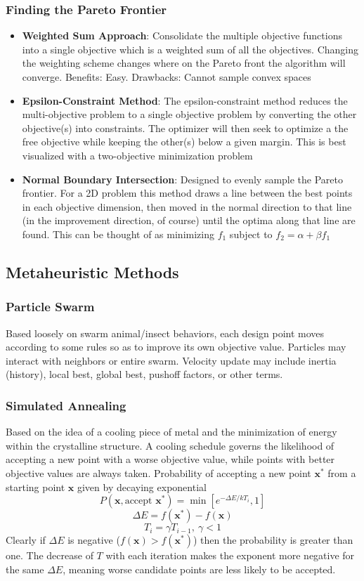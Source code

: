 \documentclass[12pt]{article}
\newcommand{\Item}[1]{\item \textbf{#1}:}
\newcommand{\boldx}{\mathbf{x}}
\newcommand{\xstar}{\boldx^*}
\begin{document}
\subsubsection{Finding the Pareto Frontier}
\begin{itemize}
\Item{Weighted Sum Approach} Consolidate the multiple objective functions into a single objective which is a weighted sum of all the objectives. Changing the weighting scheme changes where on the Pareto front the algorithm will converge. Benefits: Easy. Drawbacks: Cannot sample convex spaces
\Item{Epsilon-Constraint Method} The epsilon-constraint method reduces the multi-objective problem to a single objective problem by converting the other objective(s) into constraints. The optimizer will then seek to optimize a the free objective while keeping the other(s) below a given margin. This is best visualized with a two-objective minimization problem
\Item{Normal Boundary Intersection} Designed to evenly sample the Pareto frontier. For a 2D problem this method draws a line between the best points in each objective dimension, then moved in the normal direction to that line (in the improvement direction, of course) until the optima along that line are found. This can be thought of as minimizing $f_1$ subject to $f_2=\alpha+\beta f_1$
\end{itemize}

\subsection{Metaheuristic Methods}
\subsubsection{Particle Swarm}
Based loosely on swarm animal/insect behaviors, each design point moves according to some rules so as to improve its own objective value. Particles may interact with neighbors or entire swarm. Velocity update may include inertia (history), local best, global best, pushoff factors, or other terms.
\subsubsection{Simulated Annealing}
Based on the idea of a cooling piece of metal and the minimization of energy within the crystalline structure. A cooling schedule governs the likelihood of accepting a new point with a worse objective value, while points with better objective values are always taken. Probability of accepting a new point $\xstar$ from a starting point $\boldx$ given by decaying exponential
$$P(\boldx,\textrm{accept }\xstar) = \min\left[e^{-\Delta E/kT_i},1\right]$$
$$\Delta E = f(\xstar)-f(\boldx)$$
$$T_i=\gamma T_{i-1},\ \gamma<1$$
Clearly if $\Delta E$ is negative ($f(\boldx)>f(\xstar)$) then the probability is greater than one. The decrease of $T$ with each iteration makes the exponent more negative for the same $\Delta E$, meaning worse candidate points are less likely to be accepted.
\end{document}
